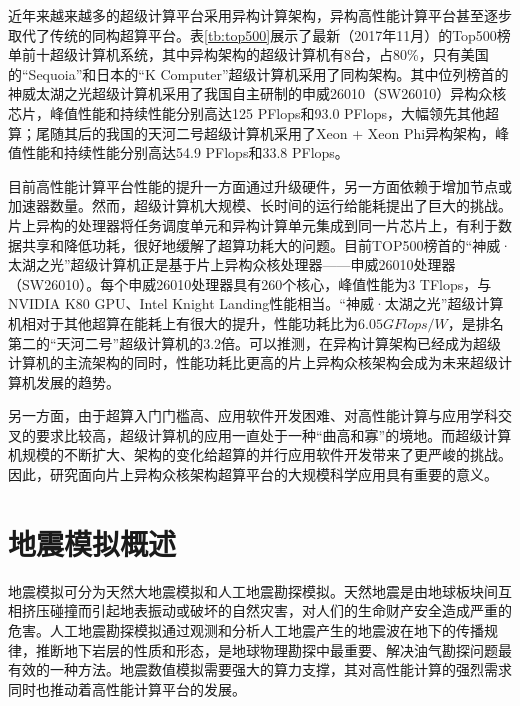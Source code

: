\documentclass[degree=doctor]{thuthesis}
\begin{document}
近年来越来越多的超级计算平台采用异构计算架构\cite{buyya1999high}，异构高性能计算平台甚至逐步取代了传统的同构超算平台。表\ref{tb:top500}展示了最新（2017年11月）的Top500榜单前十超级计算机系统，其中异构架构的超级计算机有8台，占80\%，只有美国的“Sequoia”和日本的“K Computer”超级计算机采用了同构架构。其中位列榜首的神威太湖之光超级计算机采用了我国自主研制的申威26010（SW26010）异构众核芯片，峰值性能和持续性能分别高达125 PFlops和93.0 PFlops，大幅领先其他超算；尾随其后的我国的天河二号超级计算机采用了Xeon + Xeon Phi异构架构，峰值性能和持续性能分别高达54.9 PFlops和33.8 PFlops。

目前高性能计算平台性能的提升一方面通过升级硬件，另一方面依赖于增加节点或加速器数量。然而，超级计算机大规模、长时间的运行给能耗提出了巨大的挑战\cite{reed2015exascale}。片上异构的处理器将任务调度单元和异构计算单元集成到同一片芯片上，有利于数据共享和降低功耗，很好地缓解了超算功耗大的问题。目前TOP500榜首的“神威·太湖之光”超级计算机正是基于片上异构众核处理器\cite{fu2016sunway}——申威26010处理器（SW26010）。每个申威26010处理器具有260个核心，峰值性能为3 TFlops，与NVIDIA K80 GPU、Intel Knight Landing性能相当\cite{einkemmer2017evaluation,sodani2016knights}。“神威·太湖之光”超级计算机相对于其他超算在能耗上有很大的提升，性能功耗比为$6.05GFlops/W$，是排名第二的“天河二号”超级计算机的3.2倍。可以推测，在异构计算架构已经成为超级计算机的主流架构的同时，性能功耗比更高的片上异构众核架构会成为未来超级计算机发展的趋势。

另一方面，由于超算入门门槛高、应用软件开发困难、对高性能计算与应用学科交叉的要求比较高，超级计算机的应用一直处于一种“曲高和寡”的境地。而超级计算机规模的不断扩大、架构的变化给超算的并行应用软件开发带来了更严峻的挑战。因此，研究面向片上异构众核架构超算平台的大规模科学应用具有重要的意义。


\section{地震模拟概述}
地震模拟可分为天然大地震模拟和人工地震勘探模拟。天然地震是由地球板块间互相挤压碰撞而引起地表振动或破坏的自然灾害，对人们的生命财产安全造成严重的危害\cite{地震}。人工地震勘探模拟通过观测和分析人工地震产生的地震波在地下的传播规律，推断地下岩层的性质和形态，是地球物理勘探中最重要、解决油气勘探问题最有效的一种方法\cite{地震勘探}。地震数值模拟需要强大的算力支撑，其对高性能计算的强烈需求同时也推动着高性能计算平台的发展。
\end{document}
